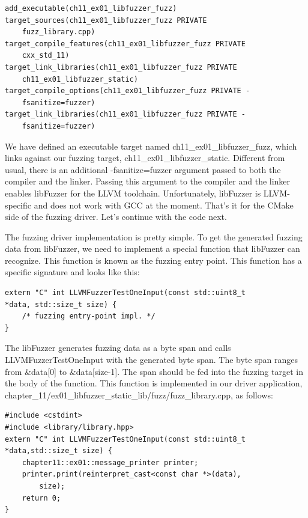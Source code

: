 \begin{lstlisting}[style=styleCMake]
add_executable(ch11_ex01_libfuzzer_fuzz)
target_sources(ch11_ex01_libfuzzer_fuzz PRIVATE
	fuzz_library.cpp)
target_compile_features(ch11_ex01_libfuzzer_fuzz PRIVATE
	cxx_std_11)
target_link_libraries(ch11_ex01_libfuzzer_fuzz PRIVATE
	ch11_ex01_libfuzzer_static)
target_compile_options(ch11_ex01_libfuzzer_fuzz PRIVATE -
	fsanitize=fuzzer)
target_link_libraries(ch11_ex01_libfuzzer_fuzz PRIVATE -
	fsanitize=fuzzer)
\end{lstlisting}

We have defined an executable target named ch11\_ex01\_libfuzzer\_fuzz, which links against our fuzzing target, ch11\_ex01\_libfuzzer\_static. Different from usual, there is an additional -fsanitize=fuzzer argument passed to both the compiler and the linker. Passing this argument to the compiler and the linker enables libFuzzer for the LLVM toolchain. Unfortunately, libFuzzer is LLVM-specific and does not work with GCC at the moment. That's it for the CMake side of the fuzzing driver. Let's continue with the code next.

The fuzzing driver implementation is pretty simple. To get the generated fuzzing data from libFuzzer, we need to implement a special function that libFuzzer can recognize. This function is known as the fuzzing entry point. This function has a specific signature and looks like this:

\begin{lstlisting}[style=styleCXX]
extern "C" int LLVMFuzzerTestOneInput(const std::uint8_t
*data, std::size_t size) {
	/* fuzzing entry-point impl. */
}
\end{lstlisting}

The libFuzzer generates fuzzing data as a byte span and calls LLVMFuzzerTestOneInput with the generated byte span. The byte span ranges from \&data[0] to \&data[size-1]. The span should be fed into the fuzzing target in the body of the function. This function is implemented in our driver application, chapter\_11/ex01\_libfuzzer\_static\_lib/fuzz/fuzz\_library.cpp, as follows:

\begin{lstlisting}[style=styleCXX]
#include <cstdint>
#include <library/library.hpp>
extern "C" int LLVMFuzzerTestOneInput(const std::uint8_t
*data,std::size_t size) {
	chapter11::ex01::message_printer printer;
	printer.print(reinterpret_cast<const char *>(data),
		size);
	return 0;
}
\end{lstlisting}

